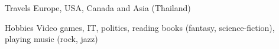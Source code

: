 
\begin{cvskills}

\cvskill
{Travels} %
{Europe, USA, Canada and Asia (Thailand)}


\cvskill
{Hobbies} %
{Video games, IT, politics, reading books (fantasy, science-fiction), playing music (rock, jazz)}

\end{cvskills}
